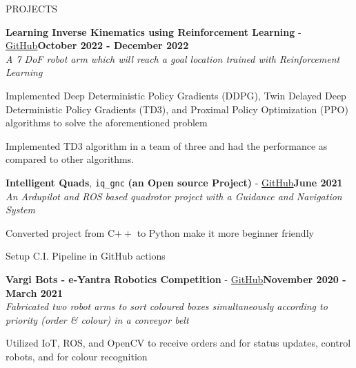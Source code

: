\documentclass{resume} %
\begin{document}
\begin{rSection}{PROJECTS}
\begin{rSubsectiond}{\textbf{Learning Inverse Kinematics using Reinforcement Learning} -  \href{https://github.com/Sahas-Ananth/RL-FinalProject}{GitHub}}{\textbf{October 2022 - December 2022}\\\textit{A 7 DoF robot arm which will reach a goal location trained with Reinforcement Learning}}
\item Implemented Deep Deterministic Policy Gradients (DDPG), Twin Delayed Deep Deterministic Policy Gradients (TD3), and Proximal Policy Optimization (PPO) algorithms to solve the aforementioned problem
\item Implemented TD3 algorithm in a team of three and had the performance as compared to other algorithms.
\end{rSubsectiond}

\begin{rSubsectiond}{\textbf{Intelligent Quads}, \texttt{iq\_gnc} \textbf{(an Open source Project)} - \href{https://github.com/Intelligent-Quads/iq_gnc}{GitHub}}{\textbf{June 2021}\\\textit{An Ardupilot and ROS based quadrotor project with a Guidance and Navigation System}}
    \item Converted project from C$++$ to Python make it more beginner friendly
    \item Setup C.I. Pipeline in GitHub actions
\end{rSubsectiond}

\begin{rSubsectiond}{\textbf{Vargi Bots - e-Yantra Robotics Competition} - \href{https://github.com/Sahas-Ananth/Vargi_Bot_Eyantra}{GitHub}}{\textbf{November 2020 - March 2021}\\\textit{Fabricated two robot arms to sort coloured boxes simultaneously according to priority (order \& colour) in a conveyor belt}}

\item Utilized IoT, ROS, and OpenCV to receive orders and for status updates, control robots, and for colour recognition

\end{rSubsectiond}

\end{rSection}
\end{document}
